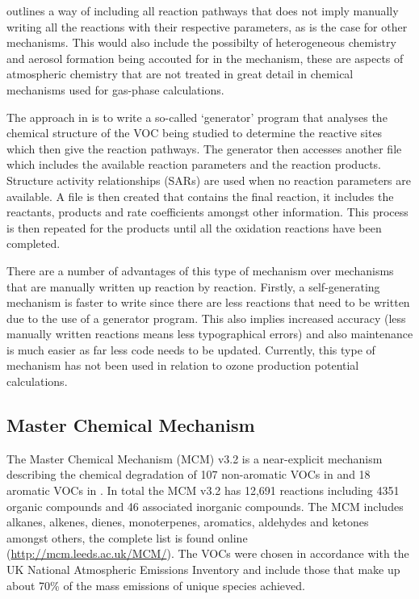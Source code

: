 \citep{Aumont:2005} outlines a way of including all reaction pathways that does not imply manually writing all the reactions with their respective parameters, as is the case for other mechanisms. 
This would also include the possibilty of heterogeneous chemistry and aerosol formation being accouted for in the mechanism, these are aspects of atmospheric chemistry that are not treated in great detail in chemical mechanisms used for gas-phase calculations.

The approach in \citep{Aumont:2005} is to write a so-called `generator' program that analyses the chemical structure of the VOC being studied to determine the reactive sites which then give the reaction pathways. 
The generator then accesses another file which includes the available reaction parameters and the reaction products. 
Structure activity relationships (SARs) are used when no reaction parameters are available. 
A file is then created that contains the final reaction, it includes the reactants, products and rate coefficients amongst other information. 
This process is then repeated for the products until all the oxidation reactions have been completed.

There are a number of advantages of this type of mechanism over mechanisms that are manually written up reaction by reaction. 
Firstly, a self-generating mechanism is faster to write since there are less reactions that need to be written due to the use of a generator program. 
This also implies increased accuracy (less manually written reactions means less typographical errors) and also maintenance is much easier as far less code needs to be updated. 
Currently, this type of mechanism has not been used in relation to ozone production potential calculations. 

\subsection{Master Chemical Mechanism}
The Master Chemical Mechanism (MCM) v3.2 is a near-explicit mechanism describing the chemical degradation of 107 non-aromatic VOCs in \citep{Saunders:2003} and 18 aromatic VOCs in \citep{Jenkin:2003}. 
In total the MCM v3.2 has 12,691 reactions including 4351 organic compounds and 46 associated inorganic compounds. 
The MCM includes alkanes, alkenes, dienes, monoterpenes, aromatics, aldehydes and ketones amongst others, the complete list is found online (\url{http://mcm.leeds.ac.uk/MCM/}). 
The VOCs were chosen in accordance with the UK National Atmospheric Emissions Inventory and include those that make up about 70\% of the mass emissions of unique species achieved.

